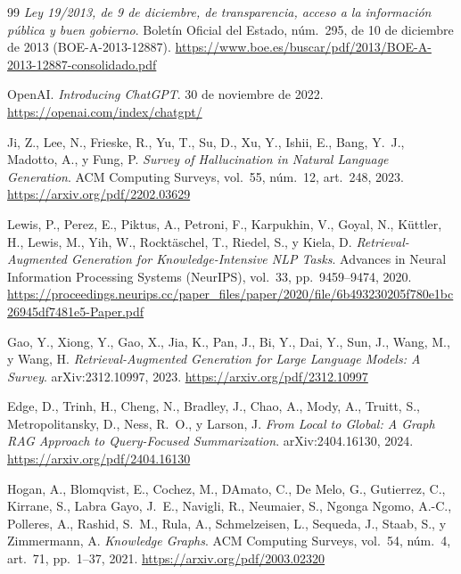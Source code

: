 \documentclass[11pt, a4paper]{report}
\begin{document}
	\cleardoublepage
	\begin{thebibliography}{99}
		\textit{Ley 19/2013, de 9 de diciembre, de transparencia, acceso a la
		información pública y buen gobierno}. Boletín Oficial del Estado,
		núm.~295, de 10 de diciembre de 2013 (BOE-A-2013-12887).
		\url{https://www.boe.es/buscar/pdf/2013/BOE-A-2013-12887-consolidado.pdf}

		OpenAI.
		\textit{Introducing ChatGPT}. 30 de noviembre de 2022.
		\url{https://openai.com/index/chatgpt/}

		Ji, Z., Lee, N., Frieske, R., Yu, T., Su, D., Xu, Y., Ishii, E., Bang,
		Y.~J., Madotto, A., y Fung, P.
		\textit{Survey of Hallucination in Natural Language Generation}. ACM
		Computing Surveys, vol.~55, núm.~12, art.~248, 2023.
		\url{https://arxiv.org/pdf/2202.03629}

		Lewis, P., Perez, E., Piktus, A., Petroni, F., Karpukhin, V., Goyal, N.,
		Küttler, H., Lewis, M., Yih, W., Rocktäschel, T., Riedel, S., y Kiela, D.
		\textit{Retrieval-Augmented Generation for Knowledge-Intensive NLP Tasks}.
		Advances in Neural Information Processing Systems (NeurIPS), vol.~33,
		pp.~9459--9474, 2020.
		\url{https://proceedings.neurips.cc/paper_files/paper/2020/file/6b493230205f780e1bc26945df7481e5-Paper.pdf}

		Gao, Y., Xiong, Y., Gao, X., Jia, K., Pan, J., Bi, Y., Dai, Y., Sun,
		J., Wang, M., y Wang, H.
		\textit{Retrieval-Augmented Generation for Large Language Models: A
		Survey}. arXiv:2312.10997, 2023.
		\url{https://arxiv.org/pdf/2312.10997}

		Edge, D., Trinh, H., Cheng, N., Bradley, J., Chao, A., Mody, A., Truitt,
		S., Metropolitansky, D., Ness, R.~O., y Larson, J.
		\textit{From Local to Global: A Graph RAG Approach to Query-Focused
		Summarization}. arXiv:2404.16130, 2024.
		\url{https://arxiv.org/pdf/2404.16130}

		Hogan, A., Blomqvist, E., Cochez, M., D\textquotesingle{}Amato, C., De Melo, G.,
		Gutierrez, C., Kirrane, S., Labra Gayo, J.~E., Navigli, R., Neumaier, S.,
		Ngonga Ngomo, A.-C., Polleres, A., Rashid, S.~M., Rula, A., Schmelzeisen,
		L., Sequeda, J., Staab, S., y Zimmermann, A.
		\textit{Knowledge Graphs}. ACM Computing Surveys, vol.~54, núm.~4,
		art.~71, pp.~1--37, 2021.
		\url{https://arxiv.org/pdf/2003.02320}


\end{thebibliography}
\end{document}
